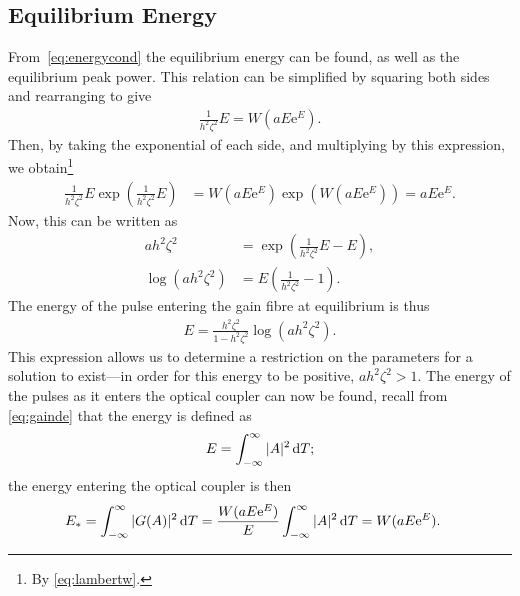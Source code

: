 \subsection{Equilibrium Energy}
From~\eqref{eq:energycond} the equilibrium energy can be found, as well as the equilibrium peak power. This relation can be simplified by squaring both sides and rearranging to give
\begin{align*}
\frac{1}{h^2 \zeta^2} E = W \left( a E \textrm{e}^E \right).
\end{align*}
Then, by taking the exponential of each side, and multiplying by this expression, we obtain\footnote{By \eqref{eq:lambertw}.}
\begin{align*}
\frac{1}{h^2 \zeta^2} E \exp \left(\frac{1}{h^2 \zeta^2} E \right) &= W \left( a E \textrm{e}^E \right) \exp \left( W \left( a E \textrm{e}^E \right) \right) = a E \textrm{e}^E.
\end{align*}
Now, this can be written as 
\begin{align*}
a h^2 \zeta^2 &= \exp \left( \frac{1}{h^2 \zeta^2}E - E \right), \\
\log \left( a h^2 \zeta^2 \right) &= E \left( \frac{1}{h^2 \zeta^2} - 1 \right).
\end{align*}
The energy of the pulse entering the gain fibre at equilibrium is thus
\begin{align*}
E = \frac{h^2 \zeta^2}{1 - h^2 \zeta^2} \log \left( a h^2 \zeta^2 \right).
\end{align*}
This expression allows us to determine a restriction on the parameters for a solution to exist---in order for this energy to be positive, $a h^2 \zeta^2 > 1$. The energy of the pulses as it enters the optical coupler can now be found, recall from \eqref{eq:gainde} that the energy is defined as
\begin{align*}
E = \int_{-\infty}^\infty |A|^2 \, \textrm{d} T;
\end{align*}
the energy entering the optical coupler is then
\begin{align}
E_* &= \int_{-\infty}^\infty |G(A)|^2 \, \textrm{d} T = \frac{W(a E \textrm{e}^E)}{E} \int_{-\infty}^\infty |A|^2 \, \textrm{d} T = W(a E \textrm{e}^E).
\end{align}

